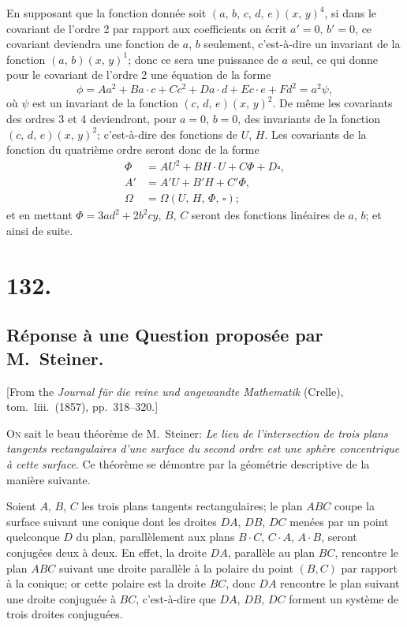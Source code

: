 \documentclass[11pt,a4paper]{article}
\theoremstyle{definition}
\begin{document}
En supposant que la fonction donn\'ee soit $(a,\, b,\, c,\, d,\, e)(x,\, y)^4$,
si dans le covariant de l'ordre 2 par rapport aux coefficients on \'ecrit
$a'=0$, $b'=0$, ce covariant deviendra une fonction de $a$, $b$ seulement,
c'est-\`a-dire un invariant de la fonction $(a,\, b)(x,\, y)^1$; donc ce sera
une puissance de $a$ seul, ce qui donne pour le covariant de l'ordre 2 une
\'equation de la forme
\[
\phi = Aa^2 + Ba\cdot c + Cc^2 + Da\cdot d + Ec\cdot e + Fd^2 = a^2 \psi,
\]
o\`u $\psi$ est un invariant de la fonction $(c,\, d,\, e)(x,\, y)^2$. De m\^eme
les covariants des ordres 3 et 4 deviendront, pour $a=0$, $b=0$, des
invariants de la fonction $(c,\, d,\, e)(x,\, y)^2$; c'est-\`a-dire des
fonctions de $U$, $H$. Les covariants de la fonction du quatri\`eme ordre
seront donc de la forme
\begin{align*}
\Phi &= AU^2 + BH\cdot U + C\Phi + D\square, \\
A' &= A'U + B'H + C'\Phi, \\
\Omega &= \Omega(U,\, H,\, \Phi,\, \square);
\end{align*}
et en mettant $\Phi = 3ad^2 + 2b^2cy$, $B$, $C$ seront des fonctions lin\'eaires
de $a$, $b$; et ainsi de suite.

\newpage
\section*{132.}
\subsection*{R\'eponse \`a une Question propos\'ee par M.~Steiner.}

[From the \textit{Journal f\"ur die reine und angewandte Mathematik} (Crelle),
tom.\ liii.\ (1857), pp.\ 318--320.]

\medskip

\textsc{On} sait le beau th\'eor\`eme de M.~Steiner: \textit{Le lieu de
l'intersection de trois plans tangents rectangulaires d'une surface du
second ordre est une sph\`ere concentrique \`a cette surface}. Ce th\'eor\`eme
se d\'emontre par la g\'eom\'etrie descriptive de la mani\`ere suivante.

Soient $A$, $B$, $C$ les trois plans tangents rectangulaires; le plan $ABC$
coupe la surface suivant une conique dont les droites $DA$, $DB$, $DC$
men\'ees par un point quelconque $D$ du plan, parall\`element aux plans
$B\!\cdot\!C$, $C\!\cdot\!A$, $A\!\cdot\!B$, seront conjug\'ees deux \`a deux. En effet,
la droite $DA$, parall\`ele au plan $BC$, rencontre le plan $ABC$ suivant
une droite parall\`ele \`a la polaire du point $(B,C)$ par rapport \`a la
conique; or cette polaire est la droite $BC$, donc $DA$ rencontre le plan
suivant une droite conjugu\'ee \`a $BC$, c'est-\`a-dire que $DA$, $DB$, $DC$
forment un syst\`eme de trois droites conjugu\'ees.
\end{document}
